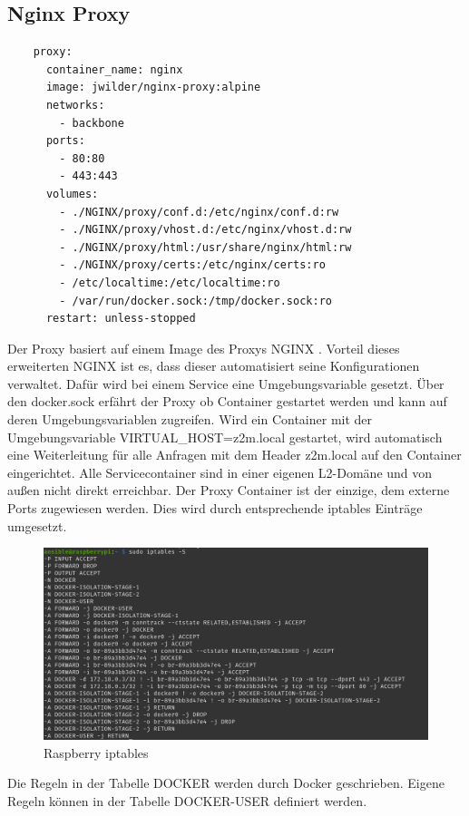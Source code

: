 \subsection{Nginx Proxy}
\begin{lstlisting}
    proxy:
      container_name: nginx
      image: jwilder/nginx-proxy:alpine
      networks:
        - backbone
      ports:
        - 80:80
        - 443:443
      volumes:
        - ./NGINX/proxy/conf.d:/etc/nginx/conf.d:rw
        - ./NGINX/proxy/vhost.d:/etc/nginx/vhost.d:rw
        - ./NGINX/proxy/html:/usr/share/nginx/html:rw
        - ./NGINX/proxy/certs:/etc/nginx/certs:ro
        - /etc/localtime:/etc/localtime:ro
        - /var/run/docker.sock:/tmp/docker.sock:ro
      restart: unless-stopped
\end{lstlisting}

Der Proxy basiert auf einem Image des Proxys NGINX \cite{nginxpm}. Vorteil dieses erweiterten NGINX ist es,
dass dieser automatisiert seine Konfigurationen verwaltet. Dafür wird bei einem Service eine Umgebungsvariable gesetzt. Über den 
\grqq docker.sock\grqq{} erfährt der Proxy ob Container gestartet werden und kann auf deren Umgebungsvariablen zugreifen. Wird ein Container mit der Umgebungsvariable 
\grqq VIRTUAL\_HOST=z2m.local \grqq{} gestartet, wird automatisch eine Weiterleitung für alle Anfragen mit dem Header \grqq z2m.local\grqq{} auf den Container eingerichtet.
Alle Servicecontainer sind in einer eigenen L2-Domäne und von außen nicht direkt erreichbar. Der Proxy Container ist der einzige, dem externe Ports zugewiesen werden.
Dies wird durch entsprechende \grqq iptables\grqq{} Einträge umgesetzt.

\begin{figure}[H]
  \centering
  \includegraphics[width=1\textwidth]{media/rasp-iptables.png}
  \caption{Raspberry iptables}
\end{figure}
Die Regeln in der Tabelle \grqq DOCKER \grqq{} werden durch Docker geschrieben. Eigene Regeln können in der Tabelle 
\grqq DOCKER-USER \grqq{} definiert werden.

